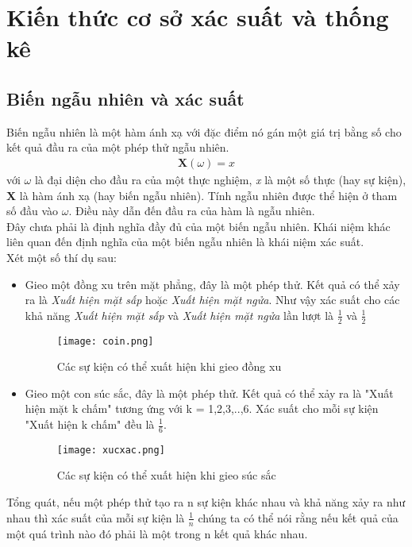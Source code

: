 \chapter{Kiến thức cơ sở xác suất và thống kê}\label{ch:1}
\section{Biến ngẫu nhiên và xác suất}\label{sec:1.1}
Biến ngẫu nhiên là một hàm ánh xạ với đặc điểm nó gán một giá trị bằng số cho kết quả đầu ra của một phép thử ngẫu nhiên.
\begin{align}
    \textbf{X}(\omega)=\textit{x}
\end{align}
với $\omega$ là đại diện cho đầu ra của một thực nghiệm, \textit{x} là một số thực (hay sự kiện), \textbf{X} là hàm ánh xạ (hay biến ngẫu nhiên).  
Tính ngẫu nhiên được thể hiện ở tham số đầu vào $\omega$. Điều này dẫn đến đầu ra của hàm là ngẫu nhiên.\\
Đây chưa phải là định nghĩa đầy đủ của một biến ngẫu nhiên. Khái niệm khác liên quan đến định nghĩa của một biến ngẫu nhiên là khái niệm xác suất. \\
Xét một số thí dụ sau:
\begin{itemize}
    \item Gieo một đồng xu trên mặt phẳng, đây là một phép thử. Kết quả có thể xảy ra là \textit{Xuất hiện mặt sấp} hoặc \textit{Xuất hiện mặt ngửa}. Như vậy xác suất cho các khả năng \textit{Xuất hiện mặt sấp} và \textit{Xuất hiện mặt ngửa} lần lượt là 
	$ \frac{1}{2} $ và $ \frac{1}{2} $
	\begin{figure}[H]
		\centering
		\texttt{[image: coin.png]}
		\caption{Các sự kiện có thể xuất hiện khi gieo đồng xu}
		\label{fig:web}
	   \end{figure}
    \item Gieo một con súc sắc, đây là một phép thử. Kết quả có thể xảy ra là "Xuất hiện mặt k chấm" tương ứng với k = 1,2,3,..,6. Xác suất cho mỗi sự kiện "Xuất hiện k chấm" đều là $ \frac{1}{6} $.
    \begin{figure}[H]
		\centering
		\texttt{[image: xucxac.png]}
		\caption{Các sự kiện có thể xuất hiện khi gieo súc sắc}
		\label{fig:web}
	   \end{figure}
\end{itemize}
Tổng quát, nếu một phép thử tạo ra n sự kiện khác nhau và khả năng xảy ra như nhau thì xác suất của mỗi sự kiện là $ \frac{1}{n} $
chúng ta có thể nói rằng nếu kết quả của một quá trình nào đó phải là một trong n kết quả khác nhau. 
\par
